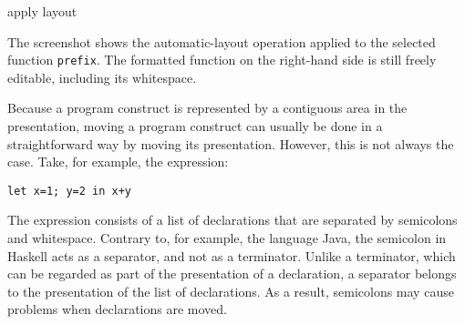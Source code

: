 \documentclass{speauth}
\begin{document}
{
\ttfamily 
{}
\rmfamily
}{\small apply layout}

The screenshot shows the automatic-layout operation applied to the selected function {\tt prefix}. The formatted function on the right-hand side is still freely editable, including its whitespace.


Because a program construct is represented by a contiguous area in the presentation, moving a program construct can usually be done in a straightforward way by moving its presentation. However, this is not always the case. Take, for example, the expression:

\verb|let x=1; y=2 in x+y|

The expression consists of a list of declarations that are separated by semicolons and whitespace. Contrary to, for example, the language Java, the semicolon in Haskell acts as a separator, and not as a terminator. Unlike a terminator, which can be regarded as part of the presentation of a declaration, a separator belongs to the presentation of the list of declarations. As a result, semicolons may cause problems when declarations are moved.
\end{document}
